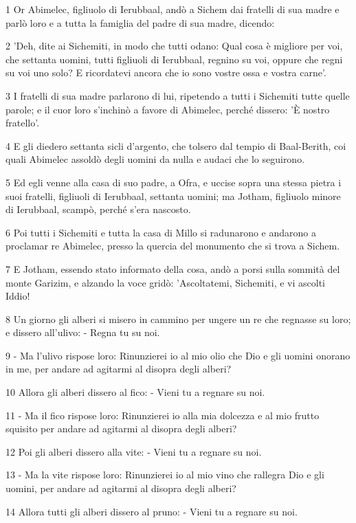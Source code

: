 \par 1 Or Abimelec, figliuolo di Ierubbaal, andò a Sichem dai fratelli di sua madre e parlò loro e a tutta la famiglia del padre di sua madre, dicendo:
\par 2 'Deh, dite ai Sichemiti, in modo che tutti odano: Qual cosa è migliore per voi, che settanta uomini, tutti figliuoli di Ierubbaal, regnino su voi, oppure che regni su voi uno solo? E ricordatevi ancora che io sono vostre ossa e vostra carne'.
\par 3 I fratelli di sua madre parlarono di lui, ripetendo a tutti i Sichemiti tutte quelle parole; e il cuor loro s'inchinò a favore di Abimelec, perché dissero: 'È nostro fratello'.
\par 4 E gli diedero settanta sicli d'argento, che tolsero dal tempio di Baal-Berith, coi quali Abimelec assoldò degli uomini da nulla e audaci che lo seguirono.
\par 5 Ed egli venne alla casa di suo padre, a Ofra, e uccise sopra una stessa pietra i suoi fratelli, figliuoli di Ierubbaal, settanta uomini; ma Jotham, figliuolo minore di Ierubbaal, scampò, perché s'era nascosto.
\par 6 Poi tutti i Sichemiti e tutta la casa di Millo si radunarono e andarono a proclamar re Abimelec, presso la quercia del monumento che si trova a Sichem.
\par 7 E Jotham, essendo stato informato della cosa, andò a porsi sulla sommità del monte Garizim, e alzando la voce gridò: 'Ascoltatemi, Sichemiti, e vi ascolti Iddio!
\par 8 Un giorno gli alberi si misero in cammino per ungere un re che regnasse su loro; e dissero all'ulivo: - Regna tu su noi.
\par 9 - Ma l'ulivo rispose loro: Rinunzierei io al mio olio che Dio e gli uomini onorano in me, per andare ad agitarmi al disopra degli alberi?
\par 10 Allora gli alberi dissero al fico: - Vieni tu a regnare su noi.
\par 11 - Ma il fico rispose loro: Rinunzierei io alla mia dolcezza e al mio frutto squisito per andare ad agitarmi al disopra degli alberi?
\par 12 Poi gli alberi dissero alla vite: - Vieni tu a regnare su noi.
\par 13 - Ma la vite rispose loro: Rinunzierei io al mio vino che rallegra Dio e gli uomini, per andare ad agitarmi al disopra degli alberi?
\par 14 Allora tutti gli alberi dissero al pruno: - Vieni tu a regnare su noi.
